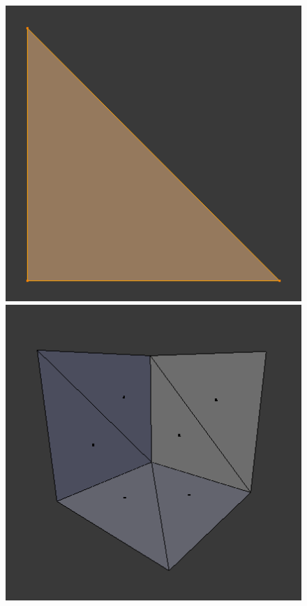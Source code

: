 \begin{figure}[!htb]
    \label{fig:3d-edges}
\endminipage\hfill
{}%
    \includegraphics[width=\linewidth]{tex/img/ch03/Basics03_Faces.png}
    \label{fig:3d-face}
\endminipage
{}%
    \includegraphics[width=\linewidth]{tex/img/ch03/Basics04_Meshes.png}
    \label{fig:3d-mesh}
\endminipage
{}
\end{figure}


